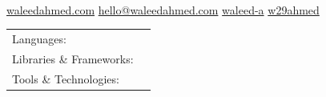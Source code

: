 \documentclass[]{awesome-cv}
\begin{document}
    
\begin{center}
	  \\
	\vspace{2mm}
	\href{https://waleedahmed.com}{{\textcolor{darkblue}{\faGlobe} waleedahmed.com}}
	\hspace{2mm}
	\href{mailto:hello@waleedahmed.com}{{\textcolor{darkblue}{\faEnvelope} hello@waleedahmed.com}}
	\hspace{2mm}
	\href{https://www.linkedin.com/in/waleed-a}{{\textcolor{darkblue}{\faLinkedin} waleed-a}}
	\hspace{2mm} 
	\href{https://github.com/w29ahmed}{{\textcolor{darkblue}{\faGithub} w29ahmed}}
\end{center}
\vspace{-4mm}
\begin{cventries}
	\cventry
	{}
	{\def\arraystretch{1.15}{\begin{tabular}{ l l }
		Languages:  & \hspace{1mm} {\skill{ C++, C, Python, Rust, Bash, JavaScript, Java, C\#, SQL }} \\
		Libraries \& Frameworks:  & \hspace{1mm} {\skill{ ROS, Protobufs, DDS, OpenCV, Node, React, Express, Flask, Google Test, Pytest }} \\
		Tools \& Technologies:  & \hspace{1mm} {\skill{ Git, Linux, Bazel, Docker, Elasticsearch, Grafana, Bamboo, Jenkins, Jira, LaTeX }} \\
		\end{tabular}}}
	{}
	{}
	{}
\end{cventries}

\vspace{-7mm}
\end{document}
